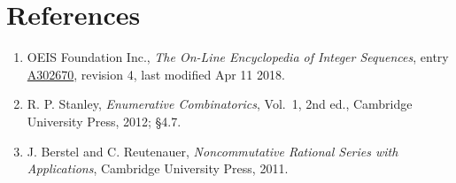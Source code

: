 \documentclass[11pt]{article}
\theoremstyle{definition}
\begin{document}
\section{References}

\begin{enumerate}

\item OEIS Foundation Inc., \emph{The On-Line Encyclopedia of Integer Sequences}, entry \href{https://oeis.org/A302670}{A302670}, revision 4, last modified Apr 11 2018.

\item R. P. Stanley, \emph{Enumerative Combinatorics}, Vol.~1, 2nd ed., Cambridge University Press, 2012; \S4.7.

\item J. Berstel and C. Reutenauer, \emph{Noncommutative Rational Series with Applications}, Cambridge University Press, 2011.

\end{enumerate}
\end{document}

